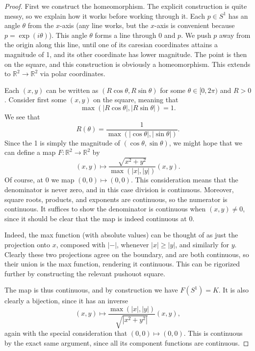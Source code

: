 \documentclass[11pt, letterpaper]{article}
\theoremstyle{plain}
\begin{document}
\begin{proof}
	First we construct the homeomorphism. The explicit construction is quite messy, so we explain how it works before working through it. Each $p\in S^1$ has an angle $\theta $ from the $x$-axis (any line works, but the $x$-axis is convenient because $p=\exp (i\theta )$). This angle $\theta $ forms a line through 0 and $p$. We push $p$ away from the origin along this line, until one of its caresian coordinates attains a magnitude of 1, and its other coordinate has lower magnitude. The point is then on the square, and this construction is obviously a homeomorphism. This extends to $\mathbb{R} ^2\to \mathbb{R} ^2$ via polar coordinates.

	Each $(x,y)$ can be written as $(R\cos \theta ,R\sin \theta )$ for some $\theta \in[0,2\pi )$ and $R>0$. Consider first some $(x,y)$ on the square, meaning that
	\[
		\max (|R \cos \theta |,|R \sin \theta |)=1
	.\]
	We see that
	\[
		R(\theta )=\frac{1}{\max (\left| \cos \theta  \right| ,\left| \sin \theta  \right| )} 
	.\]
	Since the 1 is simply the magnitude of $(\cos \theta ,\sin \theta )$, we might hope that we can define a map $F : \mathbb{R} ^2 \to \mathbb{R} ^2$ by
	\[
		(x,y)\mapsto \frac{\sqrt{x^2+y^2} }{\max \left( \left| x \right| ,\left| y \right|  \right) } (x,y)
	.\]
	Of course, at 0 we map $(0,0)\mapsto (0,0)$. This consideration means that the denominator is never zero, and in this case division is continuous. Moreover, square roots, products, and exponents are continuous, so the numerator is continuous. It suffices to show the denominator is continuous when $(x,y)\neq 0$, since it should be clear that the map is indeed continuous at 0.

	Indeed, the max function (with absolute values) can be thought of as just the projection onto $x$, composed with $\left| - \right| $, whenever $\left| x \right| \geq \left| y \right| $, and similarly for $y$. Clearly these two projections agree on the boundary, and are both continuous, so their union is the max function, rendering it continuous. This can be rigorized further by constructing the relevant pushouot square.

	The map is thus continuous, and by construction we have $F(S^1)=K$. It is also clearly a bijection, since it has an inverse
	\[
		(x,y)\mapsto \frac{\max\left( \left| x \right| ,\left| y \right|  \right) }{\sqrt{\left| x^2+y^2 \right| } } (x,y)
	,\]
	again with the special consideration that $(0,0)\mapsto (0,0)$. This is continuous by the exact same argument, since all its component functions are continuous.


\end{proof}
\end{document}
